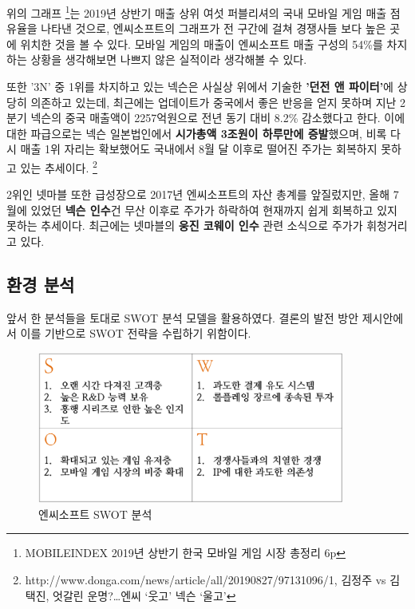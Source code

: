 \documentclass[11pt]{oblivoir}
\begin{document}
		위의 그래프 \footnote{MOBILEINDEX 2019년 상반기 한국 모바일 게임 시장 총정리 6p}는 2019년 상반기 매출 상위 여섯 퍼블리셔의 국내 모바일 게임 매출 점유율을 나타낸 것으로, 엔씨소프트의 그래프가 전 구간에 걸쳐 경쟁사들 보다 높은 곳에 위치한 것을 볼 수 있다. 모바일 게임의 매출이 엔씨소프트 매출 구성의 54\%를 차지하는 상황을 생각해보면 나쁘지 않은 실적이라 생각해볼 수 있다.
		
		또한 '3N' 중 1위를 차지하고 있는 넥슨은 사실상 위에서 기술한 \textbf{'던전 앤 파이터'}에 상당히 의존하고 있는데, 최근에는 업데이트가 중국에서 좋은 반응을 얻지 못하며 지난 2분기 넥슨의 중국 매출액이 2257억원으로 전년 동기 대비 8.2\% 감소했다고 한다. 
		이에 대한 파급으로는 넥슨 일본법인에서 \textbf{시가총액 3조원이 하루만에 증발}했으며, 비록 다시 매출 1위 자리는 확보했어도 국내에서 8월 달 이후로 떨어진 주가는 회복하지 못하고 있는 추세이다.
		\footnote{http://www.donga.com/news/article/all/20190827/97131096/1, 김정주 vs 김택진, 엇갈린 운명?…엔씨 ‘웃고’ 넥슨 ‘울고’}
		
		2위인 넷마블 또한 급성장으로 2017년 엔씨소프트의 자산 총계를 앞질렀지만, 올해 7월에 있었던 \textbf{넥슨 인수}건 무산 이후로 주가가 하락하여 현재까지 쉽게 회복하고 있지 못하는 추세이다. 최근에는 넷마블의 \textbf{웅진 코웨이 인수} 관련 소식으로 주가가 휘청거리고 있다.

		\subsection{환경 분석}
		앞서 한 분석들을 토대로 SWOT 분석 모델을 활용하였다. 결론의 발전 방안 제시안에서 이를 기반으로 SWOT 전략을 수립하기 위함이다.
		
		\begin{figure}[htbp]
			\centering
			\includegraphics[width=0.9\textwidth]{Pictures/SWOT.png}
			\caption{엔씨소프트 SWOT 분석}
		\end{figure}
	
\end{document}
